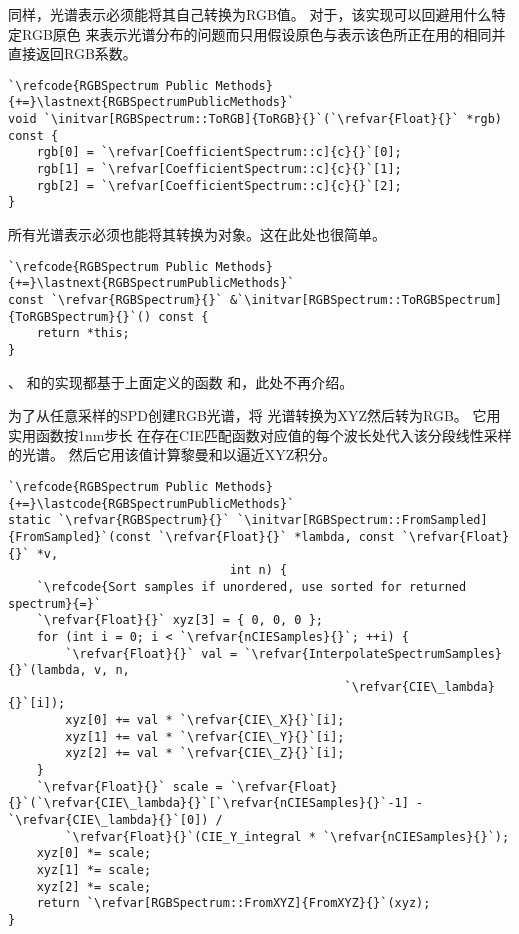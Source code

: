 同样，光谱表示必须能将其自己转换为RGB值。
对于，该实现可以回避用什么特定RGB原色
来表示光谱分布的问题而只用假设原色与表示该色所正在用的相同并直接返回RGB系数。
\begin{lstlisting}
`\refcode{RGBSpectrum Public Methods}{+=}\lastnext{RGBSpectrumPublicMethods}`
void `\initvar[RGBSpectrum::ToRGB]{ToRGB}{}`(`\refvar{Float}{}` *rgb) const {
    rgb[0] = `\refvar[CoefficientSpectrum::c]{c}{}`[0];
    rgb[1] = `\refvar[CoefficientSpectrum::c]{c}{}`[1];
    rgb[2] = `\refvar[CoefficientSpectrum::c]{c}{}`[2];
}
\end{lstlisting}

所有光谱表示必须也能将其转换为对象。这在此处也很简单。
\begin{lstlisting}
`\refcode{RGBSpectrum Public Methods}{+=}\lastnext{RGBSpectrumPublicMethods}`
const `\refvar{RGBSpectrum}{}` &`\initvar[RGBSpectrum::ToRGBSpectrum]{ToRGBSpectrum}{}`() const {
    return *this;
}
\end{lstlisting}

{}、{}
和{}的实现都基于上面定义的函数
和，此处不再介绍。

为了从任意采样的SPD创建RGB光谱，将
光谱转换为XYZ然后转为RGB。
它用实用函数按1nm步长
在存在CIE匹配函数对应值的每个波长处代入该分段线性采样的光谱。
然后它用该值计算黎曼和以逼近XYZ积分。
\begin{lstlisting}
`\refcode{RGBSpectrum Public Methods}{+=}\lastcode{RGBSpectrumPublicMethods}`
static `\refvar{RGBSpectrum}{}` `\initvar[RGBSpectrum::FromSampled]{FromSampled}`(const `\refvar{Float}{}` *lambda, const `\refvar{Float}{}` *v,
                               int n) {
    `\refcode{Sort samples if unordered, use sorted for returned spectrum}{=}`
    `\refvar{Float}{}` xyz[3] = { 0, 0, 0 };
    for (int i = 0; i < `\refvar{nCIESamples}{}`; ++i) {
        `\refvar{Float}{}` val = `\refvar{InterpolateSpectrumSamples}{}`(lambda, v, n,
                                               `\refvar{CIE\_lambda}{}`[i]);
        xyz[0] += val * `\refvar{CIE\_X}{}`[i];
        xyz[1] += val * `\refvar{CIE\_Y}{}`[i];
        xyz[2] += val * `\refvar{CIE\_Z}{}`[i];
    }
    `\refvar{Float}{}` scale = `\refvar{Float}{}`(`\refvar{CIE\_lambda}{}`[`\refvar{nCIESamples}{}`-1] - `\refvar{CIE\_lambda}{}`[0]) /
        `\refvar{Float}{}`(CIE_Y_integral * `\refvar{nCIESamples}{}`);
    xyz[0] *= scale;
    xyz[1] *= scale;
    xyz[2] *= scale;
    return `\refvar[RGBSpectrum::FromXYZ]{FromXYZ}{}`(xyz);
}
\end{lstlisting}

